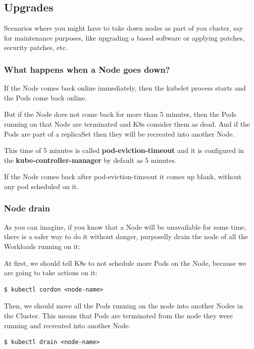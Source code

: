\documentclass{article}
\newenvironment{codetemplate}[1][]{%
  \mybasecolorbox[#1]
  \itshape
}{%
  \endmybasecolorbox
}
\begin{document}
\subsection{Upgrades}
Scenarios where you might have to take down nodes as part of you cluster, say for maintenance purposes, like upgrading a based software or applying patches, security patches, etc.

\subsubsection{What happens when a Node goes down?} 
If the Node comes back online immediately, then the kubelet process starts and the Pods come back online. 

But if the Node does not come back for more than 5 minutes, then the Pods running on that Node are terminated and K8s consider them as dead. And if the Pods are part of a replicaSet then they will be recreated into another Node.

This time of 5 minutes is called \textbf{pod-eviction-timeout} and it is configured in the \textbf{kube-controller-manager} by default as 5 minutes.

If the Node comes back after pod-eviction-timeout it comes up blank, without any pod scheduled on it.

\subsubsection{Node drain}

As you can imagine, if you know that a Node will be unavailable for some time, there is a safer way to do it without danger, purposelly drain the node of all the Workloads running on it:

At first, we should tell K8s to not schedule more Pods on the Node, because we are going to take actions on it:
\begin{codetemplate}{}
\begin{verbatim}
$ kubectl cordon <node-name>
\end{verbatim}
\end{codetemplate}

Then, we should move all the Pods running on the node into another Nodes in the Cluster. This means that Pods are terminated from the node they were running and recreated into another Node.
\begin{codetemplate}{}
\begin{verbatim}
$ kubectl drain <node-name>
\end{verbatim}
\end{codetemplate}
\end{document}
